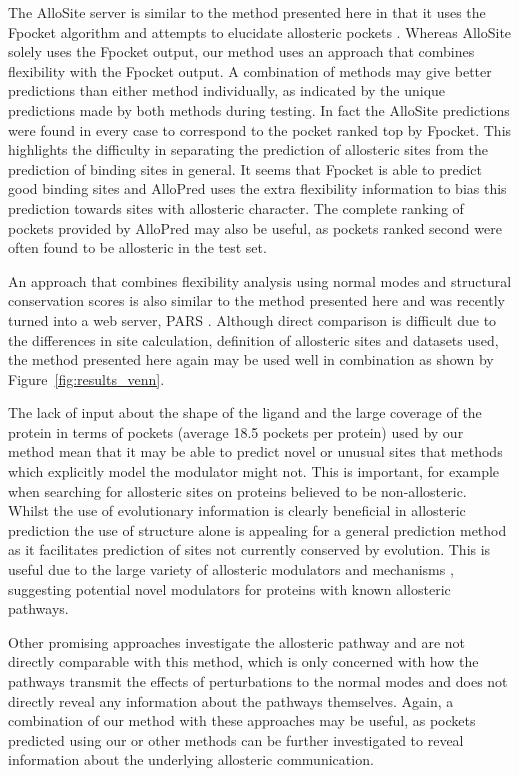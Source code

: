 The AlloSite server is similar to the method presented here in that it uses the Fpocket algorithm and attempts to elucidate allosteric pockets \cite{Huang2013}.
Whereas AlloSite solely uses the Fpocket output, our method uses an approach that combines flexibility with the Fpocket output.
A combination of methods may give better predictions than either method individually, as indicated by the unique predictions made by both methods during testing.
In fact the AlloSite predictions were found in every case to correspond to the pocket ranked top by Fpocket.
This highlights the difficulty in separating the prediction of allosteric sites from the prediction of binding sites in general.
It seems that Fpocket is able to predict good binding sites and AlloPred uses the extra flexibility information to bias this prediction towards sites with allosteric character.
The complete ranking of pockets provided by AlloPred may also be useful, as pockets ranked second were often found to be allosteric in the test set.

An approach that combines flexibility analysis using normal modes and structural conservation scores \cite{Panjkovich2012} is also similar to the method presented here and  was recently turned into a web server, PARS \cite{Panjkovich2014}.
Although direct comparison is difficult due to the differences in site calculation, definition of allosteric sites and datasets used, the method presented here again may be used well in combination as shown by Figure~\ref{fig:results_venn}.

The lack of input about the shape of the ligand and the large coverage of the protein in terms of pockets (average 18.5 pockets per protein) used by our method mean that it may be able to predict novel or unusual sites that methods which explicitly model the modulator might not.
This is important, for example when searching for allosteric sites on proteins believed to be non-allosteric.
Whilst the use of evolutionary information is clearly beneficial in allosteric prediction \cite{Reynolds2011} the use of structure alone is appealing for a general prediction method as it facilitates prediction of sites not currently conserved by evolution.
This is useful due to the large variety of allosteric modulators \cite{Wang2012} and mechanisms \cite{Motlagh2014}, suggesting potential novel modulators for proteins with known allosteric pathways.

Other promising approaches \cite{Demerdash2009, Kidd2009, Kaya2013} investigate the allosteric pathway and are not directly comparable with this method, which is only concerned with how the pathways transmit the effects of perturbations to the normal modes and does not directly reveal any information about the pathways themselves.
Again, a combination of our method with these approaches may be useful, as pockets predicted using our or other methods can be further investigated to reveal information about the underlying allosteric communication.

